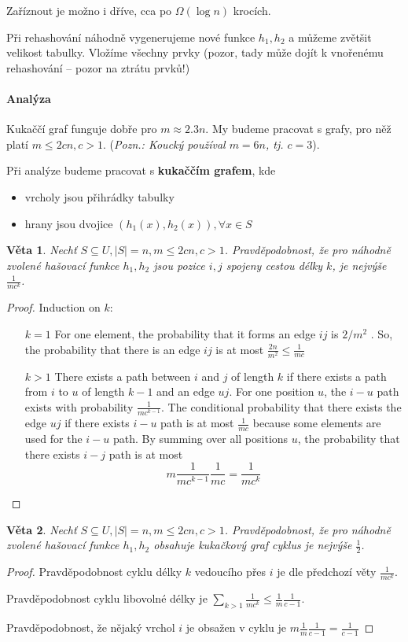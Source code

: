 \documentclass[11pt]{report} %
\newtheorem{theorem}{Věta}[section]
\numberwithin{equation}{section}
\begin{document}
Zaříznout je možno i dříve, cca po $\Omega(\log n)$ krocích.

Při rehashování náhodně vygenerujeme nové funkce $h_1, h_2$ a můžeme zvětšit velikost tabulky. Vložíme všechny prvky (pozor, tady může dojít k vnořenému rehashování -- pozor na ztrátu prvků!)


\paragraph{Analýza}
Kukaččí graf funguje dobře pro $m \approx 2.3n$. My budeme pracovat s grafy, pro něž platí $m \leq 2cn, c>1$. (\textit{Pozn.: Koucký používal $m = 6n$, tj. $c = 3$}).

Při analýze budeme pracovat s \textbf{kukaččím grafem}, kde 
\begin{itemize}
\item vrcholy jsou přihrádky tabulky
\item hrany jsou dvojice $(h_1(x), h_2(x)), \forall x \in S$	
\end{itemize}

\begin{theorem}
Nechť $S \subseteq U, |S| = n, m \leq 2cn, c>1$. Pravděpodobnost, že pro náhodně zvolené hašovací funkce $h_1, h_2$ jsou pozice $i,j$ spojeny cestou délky $k$, je nejvýše $\frac{1}{mc^k}$.
\end{theorem}
\begin{proof}
Induction on $k$:
\begin{enumerate}
	\item [$k=1$] For one element, the probability that it forms an edge $ij$ is $2/m^2$ . So, the probability that there is an edge $ij$ is at most $\frac{2n}{m^2} \leq \frac{1}{mc}$
	
	\item[$k > 1$] There exists a path between $i$ and $j$ of length $k$ if there exists a path from $i$ to $u$ of length $k - 1$ and an edge $uj$. For one position $u$, the $i-u$ path exists with probability
	$\frac{1}{mc^{k-1}}$. The conditional probability that there exists the edge $uj$ if there exists $i-u$
	path is at most $\frac{1}{mc}$ because some elements are used for the $i-u$ path. By summing
	over all positions $u$, the probability that there exists $i-j$ path is at most
	$$m\frac{1}{mc^{k-1}}\frac{1}{mc} = \frac{1}{mc^k}$$
\end{enumerate}
\end{proof}

\begin{theorem}
Nechť $S \subseteq U, |S| = n, m \leq 2cn, c>1$. Pravděpodobnost, že pro náhodně zvolené hašovací funkce $h_1, h_2$ obsahuje kukačkový graf cyklus je nejvýše $\frac{1}{2}$.
\end{theorem}
\begin{proof}
Pravděpodobnost cyklu délky $k$ vedoucího přes $i$ je dle předchozí věty $\frac{1}{mc^k}$. 

Pravděpodobnost cyklu libovolné délky je $\sum_{k>1} \frac{1}{mc^k} \leq \frac{1}{m}\frac{1}{c-1}$.

Pravděpodobnost, že nějaký vrchol $i$ je obsažen v cyklu je $m\frac{1}{m}\frac{1}{c-1} = \frac{1}{c-1}$
\end{proof}
\end{document}
